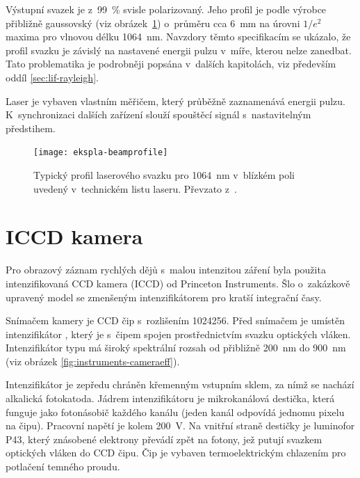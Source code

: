 Výstupní svazek je z~\SI{99}{\percent} svisle polarizovaný.
Jeho profil je podle výrobce přibližně gaussovský
(viz obrázek~\ref{fig:instruments-beamprofile})
o~průměru cca \SI{6}{\milli\metre} na úrovni $1/e^2$ maxima
pro vlnovou délku \SI{1064}{\nano\metre}.
\autocite{ekspla-datasheet}
Navzdory těmto specifikacím se ukázalo, že profil svazku je závislý
na nastavené energii pulzu v~míře, kterou nelze zanedbat.
Tato problematika je podrobněji popsána v~dalších kapitolách,
viz především oddíl \ref{sec:lif-rayleigh}.

Laser je vybaven vlastním měřičem, který průběžně zaznamenává energii pulzu.
K~synchronizaci dalších zařízení slouží spouštěcí signál s~nastavitelným
předstihem.\autocite{ekspla-datasheet}

\begin{figure}[htp]
	\centering
	\texttt{[image: ekspla-beamprofile]}
	\caption{Typický profil laserového svazku pro \SI{1064}{\nano\metre}
		v~blízkém poli uvedený v~technickém listu laseru.
		Převzato z~\cite{ekspla-datasheet}.}
	\label{fig:instruments-beamprofile}
\end{figure}

\section{ICCD kamera }
\label{sec:instruments-iccd}
Pro obrazový záznam rychlých dějů s~malou intenzitou záření byla použita
intenzifikovaná CCD kamera (ICCD) od Princeton Instruments.
Šlo o~zakázkově upravený model 
se zmenšeným intenzifikátorem pro kratší integrační časy.

Snímačem kamery je CCD čip s~rozlišením \num{1024}\times\SI{256}{\pixel}.
Před snímačem je umístěn intenzifikátor ,
který je s~čipem spojen prostřednictvím svazku optických vláken.
Intenzifikátor typu  má široký spektrální rozsah
od přibližně \SI{200}{\nano\metre} do \SI{900}{\nano\metre}
(viz obrázek \ref{fig:instruments-cameraeff}).

Intenzifikátor je zepředu chráněn křemenným vstupním sklem,
za nímž se nachází alkalická fotokatoda.
Jádrem intenzifikátoru je mikrokanálová destička,
která funguje jako fotonásobič každého kanálu
(jeden kanál odpovídá jednomu pixelu na čipu).
Pracovní napětí je kolem \SI{200}{\volt}.
Na vnitřní straně destičky je luminofor P43,
který znásobené elektrony převádí zpět na fotony,
jež putují svazkem optických vláken do CCD čipu.
\autocite{pi-iccd}
Čip je vybaven termoelektrickým chlazením pro potlačení temného proudu.
\autocite{pimax-datasheet}

